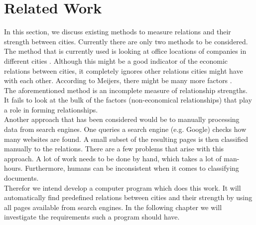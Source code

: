\section{Related Work}
In this section, we discuss existing methods to measure relations and their strength between cities. Currently there are only two methods to be considered. \\

The method that is currently used is looking at office locations of companies in different cities \cite{derudder2010intercity}. Although this might be a good indicator of the economic relations between cities, it completely ignores other relations cities might have with each other. According to Meijers, there might be many more factors \cite{meijers2007synergy}.\\

The aforementioned method is an incomplete measure of relationship strengths. It fails to look at the bulk of the factors (non-economical relationships) that play a role in forming relationships. \\

Another approach that has been considered would be to manually processing data from search engines. One queries a search engine (e.g. Google) checks how many websites are found. A small subset of the resulting pages is then classified manually to the relations. There are a few problems that arise with this approach. A lot of work needs to be done by hand, which takes a lot of man-hours. Furthermore, humans can be inconsistent when it comes to classifying documents. \\

Therefor we intend develop a computer program which does this work. It will automatically find predefined relations between cities and their strength by using all pages available from search engines. In the following chapter we will investigate the requirements such a program should have.